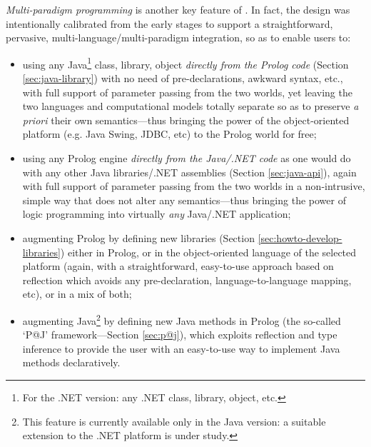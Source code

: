 \textit{Multi-paradigm programming} is another key feature of \tuprolog{}.
%
In fact, the \tuprolog{} design was intentionally calibrated from the early stages to support a straightforward, pervasive, multi-language/multi-paradigm integration, so as to enable users to:
\begin{itemize}
  \item using any Java\footnote{For the .NET version: any .NET class, library, object, etc.} class, library, object \emph{directly from the Prolog code}
  (Section \ref{sec:java-library}) with no need of pre-declarations, awkward syntax, etc., with full support of parameter passing from the two worlds, yet leaving the two languages and computational models totally separate so as to preserve \emph{a priori} their own semantics---thus bringing the power of the object-oriented platform (e.g. Java Swing, JDBC, etc) to the Prolog world for free;

  \item using any Prolog engine \emph{directly from the Java/.NET code} as one would
   do with any other Java libraries/.NET assemblies (Section \ref{sec:java-api}), again with full support of parameter passing from the two worlds in a non-intrusive, simple way that does not alter any semantics---thus bringing the power of logic programming into virtually \emph{any} Java/.NET application;

  \item augmenting Prolog by defining new libraries (Section \ref{sec:howto-develop-libraries}) either in Prolog, or in the object-oriented language of the selected platform (again, with a straightforward, easy-to-use approach based on reflection which avoids any pre-declaration, language-to-language mapping, etc), or in a mix of both;

  \item augmenting Java\footnote{This feature is currently available only in the Java version: a suitable extension to the .NET platform is under study.} by defining new Java methods in Prolog (the so-called `P@J' framework---Section \ref{sec:p@j}), which exploits reflection and type inference to provide the user with an easy-to-use way to implement Java methods declaratively.
\end{itemize}

